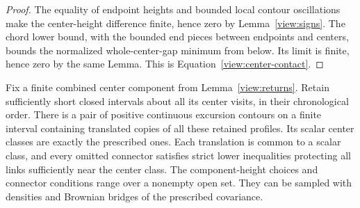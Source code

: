 \begin{proof}
The equality of endpoint heights and bounded local contour oscillations
make the center-height difference finite, hence zero by
Lemma~\ref{view:signs}.  The chord lower bound, with the bounded end pieces
between endpoints and centers, bounds the normalized whole-center-gap
minimum from below.  Its limit is finite, hence zero by the same Lemma.
This is Equation~\eqref{view:center-contact}.
\end{proof}

\begin{lemma}
\label{view:protected-completion}
Fix a finite combined center component from Lemma~\ref{view:returns}.
Retain sufficiently short closed intervals about all its center visits,
in their chronological order.  There is a pair of positive continuous
excursion contours on a finite interval containing translated copies of
all these retained profiles.  Its scalar center classes are exactly the
prescribed ones.  Each translation is common to a scalar class, and every
omitted connector satisfies strict lower inequalities protecting all
links sufficiently near the center class.  The component-height choices
and connector conditions range over a nonempty open set.  They can be
sampled with densities and Brownian bridges of the prescribed covariance.
\end{lemma}

